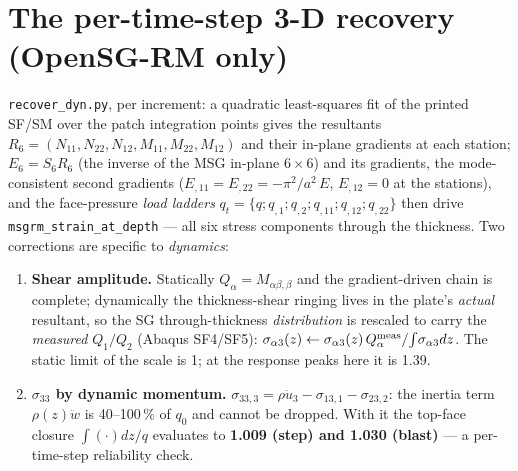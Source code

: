 \documentclass[11pt]{article}
\newcommand{\code}[1]{\texttt{#1}}
\begin{document}
\section{The per-time-step 3-D recovery (OpenSG-RM only)}
\code{recover\_dyn.py}, per increment: a quadratic least-squares fit of
the printed SF/SM over the patch integration points gives the resultants
$R_6=(N_{11},N_{22},N_{12},M_{11},M_{22},M_{12})$ and their in-plane
gradients at each station; $E_6=S_6R_6$ (the inverse of the MSG in-plane
$6\times6$) and its gradients, the mode-consistent second gradients
($E_{,11}=E_{,22}=-\pi^2/a^2\,E$, $E_{,12}=0$ at the stations), and the
face-pressure \emph{load ladders}
$q_t=\{q;q_{,1};q_{,2};q_{,11};q_{,12};q_{,22}\}$ then drive
\code{msgrm\_strain\_at\_depth} --- all six stress components through the
thickness.  Two corrections are specific to \emph{dynamics}:
\begin{enumerate}
\item \textbf{Shear amplitude.}  Statically $Q_\alpha=M_{\alpha\beta,\beta}$
and the gradient-driven chain is complete; dynamically the thickness-shear
ringing lives in the plate's \emph{actual} resultant, so the SG
through-thickness \emph{distribution} is rescaled to carry the
\emph{measured} $Q_1/Q_2$ (Abaqus SF4/SF5):
$\sigma_{\alpha3}(z)\leftarrow\sigma_{\alpha3}(z)\,
Q_\alpha^{\rm meas}/\!\int\!\sigma_{\alpha3}dz$.  The static limit of the
scale is 1; at the response peaks here it is 1.39.
\item \textbf{$\sigma_{33}$ by dynamic momentum.}
$\sigma_{33,3}=\rho\ddot u_3-\sigma_{13,1}-\sigma_{23,2}$: the inertia
term $\rho(z)\ddot w$ is 40--100\,\% of $q_0$ and cannot be dropped.  With
it the top-face closure $\int(\cdot)dz/q$ evaluates to \textbf{1.009
(step) and 1.030 (blast)} --- a per-time-step reliability check.
\end{enumerate}
\end{document}
